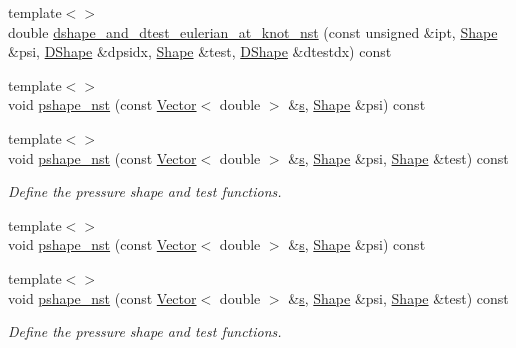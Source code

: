 \begin{DoxyCompactItemize}
\item 
{\footnotesize template$<$$>$ }\\double \hyperlink{classoomph_1_1PRefineableQCrouzeixRaviartElement_a1694309d7e0bc7ddd2691784c37cc2f0}{dshape\+\_\+and\+\_\+dtest\+\_\+eulerian\+\_\+at\+\_\+knot\+\_\+nst} (const unsigned \&ipt, \hyperlink{classoomph_1_1Shape}{Shape} \&psi, \hyperlink{classoomph_1_1DShape}{D\+Shape} \&dpsidx, \hyperlink{classoomph_1_1Shape}{Shape} \&test, \hyperlink{classoomph_1_1DShape}{D\+Shape} \&dtestdx) const
\item 
{\footnotesize template$<$$>$ }\\void \hyperlink{classoomph_1_1PRefineableQCrouzeixRaviartElement_a87afeb50892736eace1e3d68d6c53172}{pshape\+\_\+nst} (const \hyperlink{classoomph_1_1Vector}{Vector}$<$ double $>$ \&\hyperlink{cfortran_8h_ab7123126e4885ef647dd9c6e3807a21c}{s}, \hyperlink{classoomph_1_1Shape}{Shape} \&psi) const
\item 
{\footnotesize template$<$$>$ }\\void \hyperlink{classoomph_1_1PRefineableQCrouzeixRaviartElement_aa3cf8c270ec40c6d7c507b71dd6676d3}{pshape\+\_\+nst} (const \hyperlink{classoomph_1_1Vector}{Vector}$<$ double $>$ \&\hyperlink{cfortran_8h_ab7123126e4885ef647dd9c6e3807a21c}{s}, \hyperlink{classoomph_1_1Shape}{Shape} \&psi, \hyperlink{classoomph_1_1Shape}{Shape} \&test) const
\begin{DoxyCompactList}\small\item\em Define the pressure shape and test functions. \end{DoxyCompactList}\item 
{\footnotesize template$<$$>$ }\\void \hyperlink{classoomph_1_1PRefineableQCrouzeixRaviartElement_a556b7533944abd5eedce664d708b4eae}{pshape\+\_\+nst} (const \hyperlink{classoomph_1_1Vector}{Vector}$<$ double $>$ \&\hyperlink{cfortran_8h_ab7123126e4885ef647dd9c6e3807a21c}{s}, \hyperlink{classoomph_1_1Shape}{Shape} \&psi) const
\item 
{\footnotesize template$<$$>$ }\\void \hyperlink{classoomph_1_1PRefineableQCrouzeixRaviartElement_acf1d5e8b3dc66e12bff22d73d06ea4d6}{pshape\+\_\+nst} (const \hyperlink{classoomph_1_1Vector}{Vector}$<$ double $>$ \&\hyperlink{cfortran_8h_ab7123126e4885ef647dd9c6e3807a21c}{s}, \hyperlink{classoomph_1_1Shape}{Shape} \&psi, \hyperlink{classoomph_1_1Shape}{Shape} \&test) const
\begin{DoxyCompactList}\small\item\em Define the pressure shape and test functions. \end{DoxyCompactList}\end{DoxyCompactItemize}
